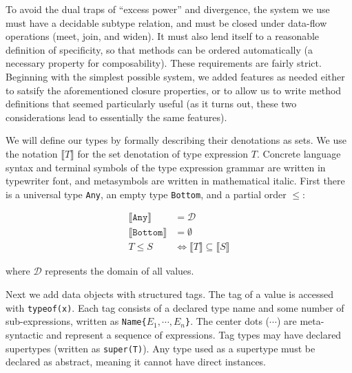 To avoid the dual traps of ``excess power'' and divergence, the system we use
must have a decidable subtype relation, and must be closed under data-flow operations
(meet, join, and widen). It must also lend itself to a reasonable definition of
specificity, so that methods can be ordered automatically (a necessary property for
composability). These requirements are fairly strict.
Beginning with the simplest possible system, we added features as
needed either to satsify the aforementioned closure properties, or to allow us to
write method definitions that seemed particularly useful (as it turns out, these
two considerations lead to essentially the same features).

We will define our types by formally describing their denotations as sets.
We use the notation $\llbracket T \rrbracket$ for the set denotation of
type expression $T$.
Concrete language syntax and terminal symbols of the type expression grammar
are written in typewriter font, and metasymbols are written in mathematical italic.
First there is a universal type \texttt{Any}, an empty type \texttt{Bottom}, and
a partial order $\leq$:

\vspace{-3ex}
\begin{align*}
  \llbracket \texttt{Any} \rrbracket &= \mathcal{D} \\
  \llbracket \texttt{Bottom} \rrbracket &= \emptyset \\
  T \leq S &\Leftrightarrow \llbracket T \rrbracket \subseteq \llbracket S \rrbracket
\end{align*}

\noindent
where $\mathcal{D}$ represents the domain of all values.

Next we add data objects with structured tags.
The tag of a value is accessed with \texttt{typeof(x)}.
Each tag consists of a declared type name and some number of sub-expressions,
written as \texttt{Name\{}$E_1, \cdots, E_n$\texttt{\}}.
The center dots ($\cdots$) are meta-syntactic and represent a sequence of expressions.
Tag types may have declared supertypes (written as \texttt{super(T)}).
Any type used as a supertype must be declared as abstract, meaning it
cannot have direct instances.


